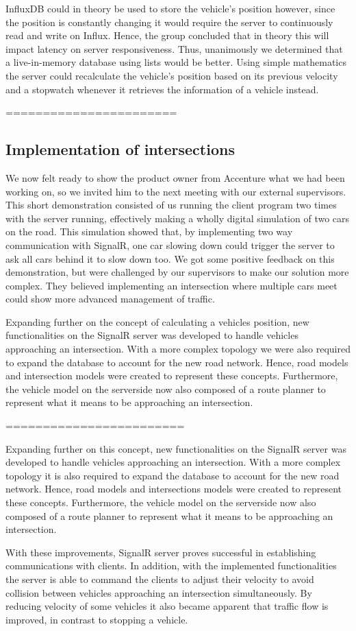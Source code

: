InfluxDB could in theory be used to store the vehicle's position however, since the position is constantly changing it would require the server to continuously read and write on Influx. Hence, the group concluded that in theory this will impact latency on server responsiveness. Thus, unanimously we determined that a live-in-memory database using lists would be better. Using simple mathematics the server could recalculate the vehicle's position based on its previous velocity and a stopwatch whenever it retrieves the information of a vehicle instead.

=======================

\subsection{Implementation of intersections}
We now felt ready to show the product owner from Accenture what we had been working on, so we invited him to the next meeting with our external supervisors. This short demonstration consisted of us running the client program two times with the server running, effectively making a wholly digital simulation of two cars on the road. This simulation showed that, by implementing two way communication with SignalR, one car slowing down could trigger the server to ask all cars behind it to slow down too. We got some positive feedback on this demonstration, but were challenged by our supervisors to make our solution more complex. They believed implementing an intersection where multiple cars meet could show more advanced management of traffic.

Expanding further on the concept of calculating a vehicles position, new functionalities on the SignalR server was developed to handle vehicles approaching an intersection. With a more complex topology we were also required to expand the database to account for the new road network. Hence, road models and intersection models were created to represent these concepts. Furthermore, the vehicle model on the serverside now also composed of a route planner to represent what it means to be approaching an intersection.

========================


Expanding further on this concept, new functionalities on the SignalR server was developed to handle vehicles approaching an intersection. With a more complex topology it is also required to expand the database to account for the new road network. Hence, road models and intersections models were created to represent these concepts. Furthermore, the vehicle model on the serverside now also composed of a route planner to represent what it means to be approaching an intersection.

With these improvements, SignalR server proves successful in establishing communications with clients. In addition, with the implemented functionalities the server is able to command the clients to adjust their velocity to avoid collision between vehicles approaching an intersection simultaneously. By reducing velocity of some vehicles it also became apparent that traffic flow is improved, in contrast to stopping a vehicle.

